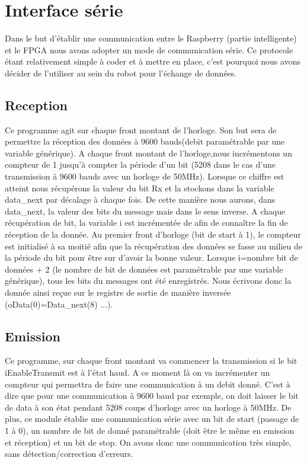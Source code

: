 \section{Interface série}
Dans le but d'établir une communication entre le Raspberry (partie intelligente) et le FPGA nous avons adopter un mode de communication série. Ce protocole étant relativement simple à 
coder et à mettre en place, c'est pourquoi nous avons décider de l'utiliser au sein du robot pour l'échange de données.

\subsection{Reception}
Ce programme agit sur chaque front montant de l'horloge. Son but sera de permettre la réception des
données à 9600 bauds(debit paramétrable par une variable générique).
A chaque front montant de l'horloge,nous incrémentons un compteur
de 1 jusqu'à compter la période d'un bit (5208 dans le cas d'une transmission à 9600 bauds avec un horloge de 50MHz). Lorsque ce chiffre est atteint nous récupérons la
valeur du bit Rx et la stockons dans la variable data\_next par décalage à chaque fois. De cette
manière nous aurons, dans data\_next, la valeur des bits du message mais dans le sens inverse. A
chaque récupération de bit, la variable i est incrémentée de afin de connaître la fin de réception de
la donnée.
Au premier front d'horloge (bit de start à 1), le compteur est initialisé à sa moitié afin que la
récupération des données se fasse au milieu de la période du bit pour être sur d'avoir la bonne
valeur.
Lorsque i=nombre bit de données + 2 (le nombre de bit de données est paramétrable par une variable générique), tous les bits du messages ont été enregistrés.
Nous écrivons donc la donnée ainsi reçue sur le registre de sortie de manière inversée (oData(0)=Data\_next(8) ...).

\subsection{Emission}
Ce programme, sur chaque front montant va commencer la transmission si le bit iEnableTransmit est à l'état haud. A ce moment là on va incrémenter un compteur qui
permettra de faire une communication à un debit donné. C'est à dire que pour une communication à 9600 baud par exemple, on doit laisser le bit de data à son état 
pendant 5208 coups d'horloge avec un horloge à 50MHz. De plus, ce module établie une communication série avec un bit de start (passage de 1 à 0), un nombre de bit de donné
paramétrable (doit être le même en emission et réception) et un bit de stop.
On avons donc une communication très simple, sans détection/correction d'erreurs.

